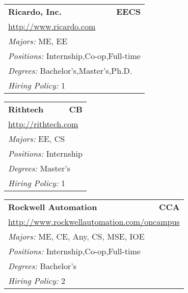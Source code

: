 \documentclass[twoside]{article}
\begin{document}
\begin{center}
\begin{multicols}{3}
\begin{FlushLeft}
\begin{minipage}{.9\columnwidth}
\end{minipage}
 
\begin{minipage}{.9\columnwidth}\begin{tabularx}{.95\columnwidth}{Xr}
                 {\Large\bf Ricardo, Inc.} & {\Large\bf EECS}\\
    \multicolumn{2}{p{.95\columnwidth}}{\url{http://www.ricardo.com}}\\
    \multicolumn{2}{p{.95\columnwidth}}{\emph{Majors:} ME, EE}\\
    \multicolumn{2}{p{.95\columnwidth}}{\emph{Positions:} Internship,Co-op,Full-time}\\
    \multicolumn{2}{p{.95\columnwidth}}{\emph{Degrees:} Bachelor's,Master's,Ph.D.}\\
    \multicolumn{2}{p{.95\columnwidth}}{\emph{Hiring Policy:} 1}\\
    \end{tabularx}
    
\end{minipage}
 
\begin{minipage}{.9\columnwidth}\begin{tabularx}{.95\columnwidth}{Xr}
                 {\Large\bf Rithtech} & {\Large\bf CB}\\
    \multicolumn{2}{p{.95\columnwidth}}{\url{http://rithtech.com}}\\
    \multicolumn{2}{p{.95\columnwidth}}{\emph{Majors:} EE, CS}\\
    \multicolumn{2}{p{.95\columnwidth}}{\emph{Positions:} Internship}\\
    \multicolumn{2}{p{.95\columnwidth}}{\emph{Degrees:} Master's}\\
    \multicolumn{2}{p{.95\columnwidth}}{\emph{Hiring Policy:} 1}\\
    \end{tabularx}
    
\end{minipage}
 
\begin{minipage}{.9\columnwidth}\begin{tabularx}{.95\columnwidth}{Xr}
                 {\Large\bf Rockwell Automation} & {\Large\bf CCA}\\
    \multicolumn{2}{p{.95\columnwidth}}{\url{http://www.rockwellautomation.com/oncampus}}\\
    \multicolumn{2}{p{.95\columnwidth}}{\emph{Majors:} ME, CE, Any, CS, MSE, IOE}\\
    \multicolumn{2}{p{.95\columnwidth}}{\emph{Positions:} Internship,Co-op,Full-time}\\
    \multicolumn{2}{p{.95\columnwidth}}{\emph{Degrees:} Bachelor's}\\
    \multicolumn{2}{p{.95\columnwidth}}{\emph{Hiring Policy:} 2}\\
    \end{tabularx}
    

\end{minipage}
\end{FlushLeft}
\end{multicols}
\end{center}
\end{document}
